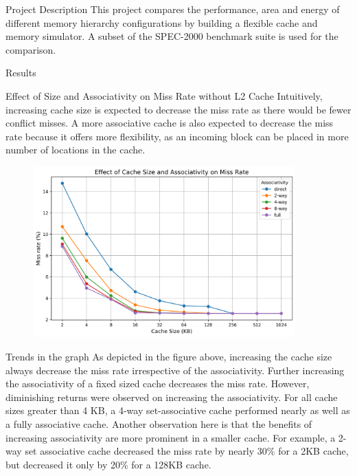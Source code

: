 
\begin{section}{Project Description}
This project compares the performance, area and energy of different memory hierarchy configurations by building a flexible cache and memory simulator. A subset of the SPEC-2000 benchmark suite is used for the comparison.
\end{section}


\begin{section}{Results}

    \begin{subsection}{Effect of Size and Associativity on Miss Rate without L2 Cache}
    Intuitively, increasing cache size is expected to decrease the miss rate as there would be fewer conflict misses. A more associative cache is also expected to decrease the miss rate because it offers more flexibility, as an incoming block can be placed in more number of locations in the cache.

    \begin{figure}[h!]
        \includegraphics[width=0.9\textwidth]{figures/fig1/fig1.png}
        \centering
        \label{fig:fig1}
    \end{figure}

    \begin{subsubsection}{Trends in the graph}
    As depicted in the figure above, increasing the cache size always decrease the miss rate irrespective of the associativity. Further increasing the  associativity of a fixed sized cache decreases the miss rate. However, diminishing returns were observed on increasing the associativity. For all cache sizes greater than 4 KB, a 4-way set-associative cache performed nearly as well as a fully associative cache. Another observation here is that the benefits of increasing associativity are more prominent in a smaller cache. For example, a 2-way set associative cache decreased the miss rate by nearly 30\% for a 2KB cache, but decreased it only by 20\% for a 128KB cache.
    \end{subsubsection}


\end{subsection}
\end{section}
